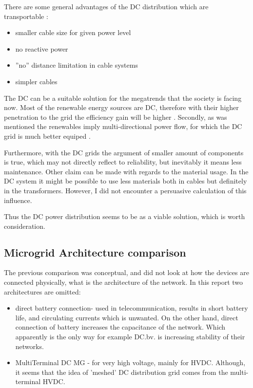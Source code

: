 \documentclass[]{scrartcl}
\begin{document}
There are some general advantages of the DC distribution which are transportable\cite{Jovcic2014} :
\begin{itemize}
	\item smaller cable size for given power level
	\item no reactive power 
	\item ''no'' distance limitation in cable systems
	\item simpler cables
\end{itemize}


The DC can be a suitable solution for the megatrends that the society is facing now. Most of the renewable energy sources are DC, therefore with their higher penetration to the grid the efficiency gain will be higher \cite{Evans2013}. Secondly, as was mentioned the renewables imply multi-directional power flow, for which the DC grid is much better equiped \cite{Doncker2014}. 

Furthermore, with the DC grids the argument of smaller amount of components is true, which may not directly reflect to reliability, but inevitably it means less maintenance. Other claim can be made with regards to the material usage. In the DC system it might be possible to use less materials both in cables but definitely in the transformers. However, I did not encounter a persuasive calculation of this influence.

Thus the DC power distribution seems to be as a viable solution, which is worth consideration.


\subsection{Microgrid Architecture comparison}
The previous comparison was conceptual, and did not look at how the devices are connected physically, what is the architecture of the network. In this report two architectures are omitted:
\begin{itemize}
	\item direct battery connection- used in telecommunication, results in short battery life, and circulating currents which is unwanted. On the other hand, direct connection of battery increases the capacitance of the network. Which apparently is the only way for example DC.bv. is increasing stability of their networks.
	\item MultiTerminal DC MG - for very high voltage, mainly for HVDC. Although, it seems that the idea of 'meshed' DC distribution grid \cite{Mackay2015a} comes from the multi-terminal HVDC.
\end{itemize}
\end{document}
